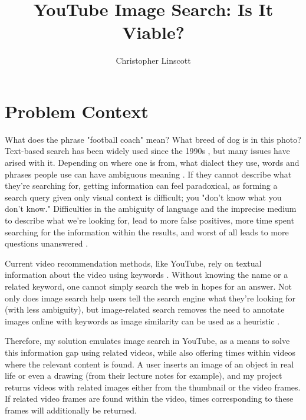 \documentclass[10pt,twocolumn]{article}
\title{YouTube Image Search: Is It Viable?}
\author{Christopher Linscott}
\affiliation{Occidental College}
\begin{document}
\maketitle


\section{Problem Context}


What does the phrase "football coach" mean? What breed of dog is in this photo? Text-based search has been widely used since the 1990s \cite{}, but many issues have arised with it. Depending on where one is from, what dialect they use, words and phrases people use can have ambiguous meaning \cite{Beall2008}. If they cannot describe what they're searching for, getting information can feel paradoxical, as forming a search query given only visual context is difficult; you "don't know what you don't know." Difficulties in the ambiguity of language and the imprecise medium to describe what we're looking for, lead to more false positives, more time spent searching for the information within the results, and worst of all leads to more questions unanswered \cite{}.

Current video recommendation methods, like YouTube, rely on textual information about the video using keywords \cite{Stanford2021}. Without knowing the name or a related keyword, one cannot simply search the web in hopes for an answer. Not only does image search help users tell the search engine what they’re looking for (with less ambiguity), but image-related search removes the need to annotate images online with keywords as image similarity can be used as a heuristic \cite{Adrakatti2016}.

Therefore, my solution emulates image search in YouTube, as a means to solve this information gap using related videos, while also offering times within videos where the relevant content is found. A user inserts an image of an object in real life or even a drawing (from their lecture notes for example), and my project returns videos with related images either from the thumbnail or the video frames. If related video frames are found within the video, times corresponding to these frames will additionally be returned.
\end{document}
